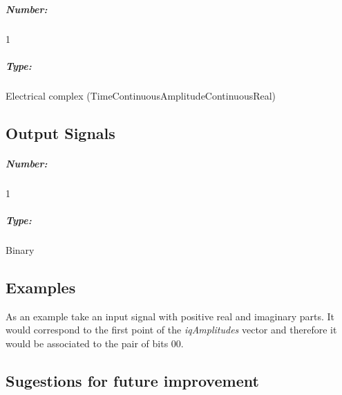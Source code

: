 \documentclass[a4paper]{article}
\begin{document}
\subparagraph*{Number:} 1

\subparagraph*{Type:} Electrical complex (TimeContinuousAmplitudeContinuousReal)

\subsection*{Output Signals}

\subparagraph*{Number:} 1

\subparagraph*{Type:} Binary 

\subsection*{Examples}

As an example take an input signal with positive real and imaginary parts. It would correspond to the first point of the \textit{iqAmplitudes} vector and therefore it would be associated to the  pair of bits $00$. 

\subsection*{Sugestions for future improvement}
\end{document}

